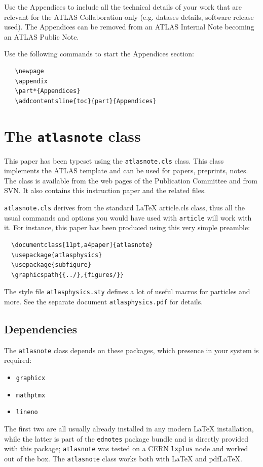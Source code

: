 \documentclass[11pt,a4paper]{../atlasnote}
\begin{document}
Use the Appendices to include all the technical details of your work
that are relevant for the ATLAS Collaboration only (e.g. datases
details, software release used). The Appendices can be removed from
an ATLAS Internal Note becoming an ATLAS Public Note.

Use the following commands to start the Appendices section:
\begin{verbatim}
   \newpage
   \appendix
   \part*{Appendices}
   \addcontentsline{toc}{part}{Appendices}
\end{verbatim}

\section{The \texttt{atlasnote} class}
\label{app:AtlasNoteCls}

This paper has been typeset using the \texttt{atlasnote.cls} class.
This class implements the ATLAS template and can be used for papers, preprints,
notes. The class is available from the web pages of the
Publication Committee and from SVN.
It also contains this instruction paper and the related files.

\texttt{atlasnote.cls} derives from the standard \LaTeX{} {article.cls}
class, thus all the usual commands and options you would have used
with \texttt{article} will work with it. For instance, this paper has
been produced using this very simple preamble:

\begin{verbatim}
  \documentclass[11pt,a4paper]{atlasnote}
  \usepackage{atlasphysics}
  \usepackage{subfigure}
  \graphicspath{{../},{figures/}}
\end{verbatim}

The style file \texttt{atlasphysics.sty} defines a lot of useful
macros for particles and more. See the separate document
\texttt{atlasphysics.pdf} for details.

\subsection{Dependencies}

The \texttt{atlasnote} class depends on these packages, which presence in
your system is required:
\begin{itemize}
  \item \texttt{graphicx}
  \item \texttt{mathptmx}
  \item \texttt{lineno}
\end{itemize}
The first two are all usually already installed in any modern \LaTeX{}
installation, while the latter is part of the {\tt ednotes} package
bundle and is directly provided with this package; \texttt{atlasnote} was
tested on a CERN \texttt{lxplus} node and worked out of the box. 
The \texttt{atlasnote} class works both with \LaTeX{} and pdf\LaTeX{}.
\end{document}
